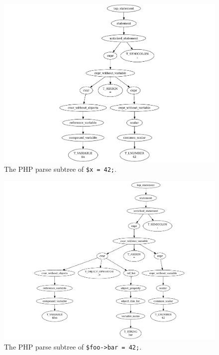 \begin{figure}[htb]
  \begin{center}
    \includegraphics[scale=0.7]{images/simple-variable-assignment}
   \caption{The PHP parse subtree of \texttt{\$x = 42;}.}
   \label{fig:simple-variable-assignment}
  \end{center}
\end{figure}

\begin{figure}[htb]
  \begin{center}
    \includegraphics[scale=0.7]{images/one-level-field-access-left}
   \caption{The PHP parse subtree of \texttt{\$foo->bar = 42;}.}
   \label{fig:one-level-field-access-left}
  \end{center}
\end{figure}


